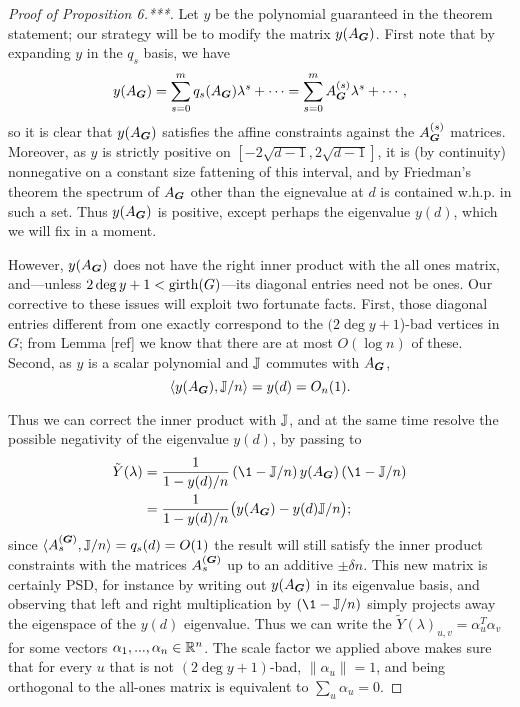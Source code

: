 \begin{proof}[Proof of Proposition 6.***]
    Let $y$ be the polynomial guaranteed in the theorem statement; our strategy will be to modify the matrix $y(A_{\boldsymbol{G}})$. First note that by expanding $y$ in the $q_s$ basis, we have
    $$
        y(A_{\boldsymbol{G}}) = \sum_{s = 0}^m q_s(A_{\boldsymbol{G}})\lambda^s + \cdots = \sum_{s=0}^m A^{(s)}_{\boldsymbol{G}}\lambda^s + \cdots,
    $$
    so it is clear that $y(A_{\boldsymbol{G}})$ satisfies the affine constraints against the $A^{(s)}_{\boldsymbol{G}}$ matrices. Moreover, as $y$ is strictly positive on $[-2\sqrt{d-1},2\sqrt{d-1}]$, it is (by continuity) nonnegative on a constant size fattening of this interval, and by Friedman's theorem the spectrum of $A_{\boldsymbol{G}}$ other than the eignevalue at $d$ is contained w.h.p. in such a set. Thus $y(A_{\boldsymbol{G}})$ is positive, except perhaps the eigenvalue $y(d)$, which we will fix in a moment.
    
    However, $y(A_{\boldsymbol{G}})$ does not have the right inner product with the all ones matrix, and---unless $2\deg y + 1 < \operatorname{girth}(G)$---its diagonal entries need not be ones. Our corrective to these issues will exploit two fortunate facts. First, those diagonal entries different from one exactly correspond to the $(2\deg y + 1$)-bad vertices in $G$; from Lemma [ref] we know that there are at most $O(\log n)$ of these. Second, as $y$ is a scalar polynomial and $\mathbb{J}$ commutes with $A_{\boldsymbol{G}}$,
    $$
        \langle y (A_{\boldsymbol{G}}),\mathbb{J}/n \rangle = y(d) = O_n(1).
    $$
    
    Thus we can correct the inner product with $\mathbb{J}$, and at the same time resolve the possible negativity of the eigenvalue $y(d)$, by passing to
    \begin{align*}
         \tilde Y(\lambda) 
         &= \frac{1}{1 - y(d)/n} \left(\1 - \bbJ/n\right) y(A_{\bG})\left(\1 - \bbJ/n\right) \\
         &= \frac{1}{1 - y(d)/n} \big(y(A_{\bG}) - y(d)\bbJ/n\big);
    \end{align*}
    since $\langle A^{(\boldsymbol{G})}_{s},\mathbb{J}/n\rangle = q_s(d) = O(1)$ the result will still satisfy the inner product constraints with the matrices $A^{(\boldsymbol{G})}_{s}$ up to an additive $\pm \delta n$. This new matrix is certainly PSD, for instance by writing out $y(A_{\boldsymbol{G}})$ in its eigenvalue basis, and observing that left and right multiplication by $(\1 - \bbJ/n)$ simply projects away the eigenspace of the $y(d)$ eigenvalue. Thus we can write the $\tilde Y(\lambda)_{u,v} = \alpha_u^T\alpha_v$ for some vectors $\alpha_1,...,\alpha_n \in \mathbb{R}^n$. The scale factor we applied above makes sure that for every $u$ that is not $(2\deg y + 1)$-bad, $\|\alpha_u\| = 1$, and being orthogonal to the all-ones matrix is equivalent to $\sum_u \alpha_u = 0$.
    

\end{proof}
